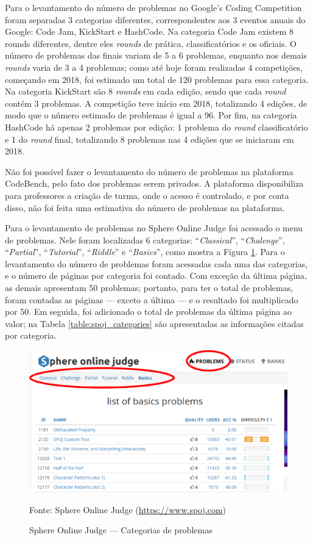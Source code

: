 Para o levantamento do número de problemas no Google's Coding Competition foram separadas 3 categorias diferentes, correspondentes aos 3 eventos anuais do Google: Code Jam, KickStart e HashCode. Na categoria Code Jam existem 8 rounds diferentes, dentre eles \textit{rounds} de prática, classificatórios e os oficiais. O número de problemas das finais variam de 5 a 6 problemas, enquanto nos demais \textit{rounds} varia de 3 a 4 problemas; como até hoje foram realizadas 4 competições, começando em 2018, foi estimado um total de 120 problemas para essa categoria. Na categoria KickStart são 8 \textit{rounds} em cada edição, sendo que cada \textit{round} contém 3 problemas. A competição teve início em 2018, totalizando 4 edições, de modo que o número estimado de problemas é igual a 96. Por fim, na categoria HashCode há apenas 2 problemas por edição: 1 problema do \textit{round} classificatório e 1 do \textit{round} final, totalizando 8 problemas nas 4 edições que se iniciaram em 2018.

Não foi possível fazer o levantamento do número de problemas na plataforma CodeBench, pelo fato dos problemas serem privados. A plataforma disponibiliza para professores a criação de turma, onde o acesso é controlado, e por conta disso, não foi feita uma estimativa do número de problemas na plataforma.

Para o levantamento de problemas no Sphere Online Judge foi acessado  o menu de problemas. Nele foram localizadas 6 categorias: ``\textit{Classical}'', ``\textit{Chalenge}'', ``\textit{Partial}'', ``\textit{Tutorial}'', ``\textit{Riddle}'' e ``\textit{Basics}'', como mostra a Figura \ref{fig:spoj}. Para o levantamento do número de problemas foram acessadas cada uma das categorias, e o número de páginas por categoria foi contado. Com exceção da última página, as demais apresentam 50 problemas; portanto, para ter o total de problemas, foram contadas as páginas — exceto a última — e o resultado foi multiplicado por 50. Em seguida, foi adicionado o total de problemas da última página ao valor; na Tabela \ref{table:spoj_categories} são apresentadas as informações citadas por categoria.

\begin{figure}
    \centering
    \caption{Sphere Online Judge — Categorias de problemas}
    \includegraphics[keepaspectratio=true,scale=0.4]{figuras/spoj.eps}
    \label{fig:spoj}
    
    \medskip
    Fonte: Sphere Online Judge (\url{https://www.spoj.com})
    \medskip
\end{figure}


